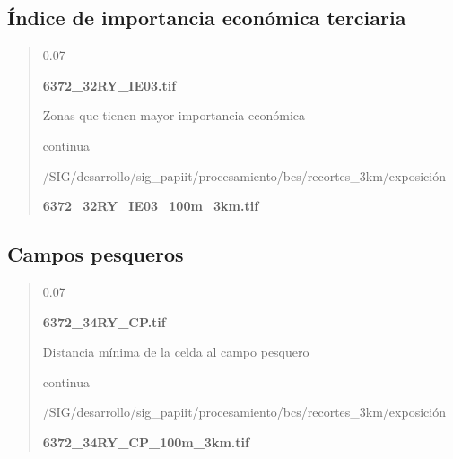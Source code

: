 \documentclass[letterpaper,10pt,spanish]{sphinxmanual}
\begin{document}
\subsection{Índice de importancia económica terciaria}
\label{\detokenize{exposicion_bcs:indice-de-importancia-economica-terciaria}}
\begin{quote}

 0.07

 {\color{red}\bfseries{}\textbar{}6372\_32RY\_IE03.tif\textbar{}}

 Zonas que tienen mayor importancia económica

 continua


 /SIG/desarrollo/sig\_papiit/procesamiento/bcs/recortes\_3km/exposición

  {\color{red}\bfseries{}\textbar{}6372\_32RY\_IE03\_100m\_3km.tif\textbar{}}
\begin{quote}

\end{quote}
\end{quote}


\subsection{Campos pesqueros}
\label{\detokenize{exposicion_bcs:campos-pesqueros}}
\begin{quote}

 0.07

 {\color{red}\bfseries{}\textbar{}6372\_34RY\_CP.tif\textbar{}}

 Distancia mínima de la celda al campo pesquero

 continua


 /SIG/desarrollo/sig\_papiit/procesamiento/bcs/recortes\_3km/exposición

  {\color{red}\bfseries{}\textbar{}6372\_34RY\_CP\_100m\_3km.tif\textbar{}}
\begin{quote}

\end{quote}
\end{quote}
\end{document}

